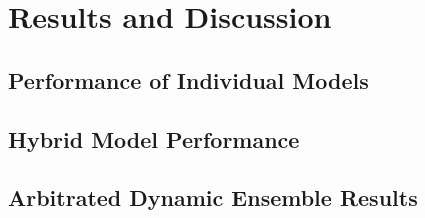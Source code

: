 \chapter{Results and Discussion}

\section{Performance of Individual Models}


\section{Hybrid Model Performance} 


\section{Arbitrated Dynamic Ensemble Results}

